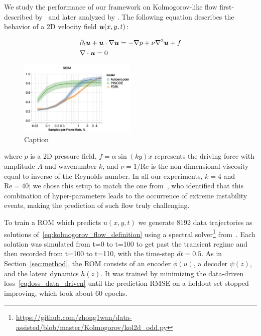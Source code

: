 \label{sec:kolmogorov_flow}
We study the performance of our framework on Kolmogorov-like flow first-described by~\citep{dovzhenko1981generation} and later analyzed by \citep{tithof2017bifurcations,suri2017forecasting}. The following equation describes the behavior of a 2D velocity field $\boldsymbol{u}(x, y, t)$:


\begin{align}
\label{eq:kolmogorov_flow_definition}
	& \partial_t \boldsymbol{u} + \boldsymbol{u} \cdot \nabla \boldsymbol{u} = -\nabla p + \nu\nabla^2\boldsymbol{u} + f \\
	& \nabla \cdot \boldsymbol{u} = 0
\end{align}

\begin{figure}[t]
    \centering
    \includegraphics[width=0.5\textwidth]{figures/cs_kolm_aggregate_all.png}
    \caption{Caption}
    \label{fig:cs_kolm_agg}
\end{figure}

where $p$ is a 2D pressure field, $f = \alpha\sin(ky)x$ represents the driving force with amplitude $A$ and wavenumber $k$, and $\nu = 1/\text{Re}$ is the non-dimensional viscosity equal to inverse of the Reynolds number. In all our experiments, $k = 4$ and $\text{Re} = 40$; we chose this setup to match the one from~\citep{wan2018data}, who identified that this combination of hyper-parameters leads to the occurrence of extreme instability events, making the prediction of such flow truly challenging. 

To train a ROM which predicts $u(x, y, t)$ we generate 8192 data trajectories as solutions of~\eqref{eq:kolmogorov_flow_definition} using a spectral solver\footnote{\href{https://github.com/zhong1wan/data-assisted/blob/master/Kolmogorov/kol2d_odd.py}{https://github.com/zhong1wan/data-assisted/blob/master/Kolmogorov/kol2d\_odd.py}} from~\citep{wan2018data}. Each solution was simulated from t=0 to t=100 to get past the transient regime and then recorded from t=100 to t=110, with the time-step $dt=0.5$. As in Section~\ref{sec:method}, the ROM consists of an encoder $\phi(u)$, a decoder $\psi(z)$, and the latent dynamics $h(z)$. It was trained by minimizing the data-driven loss~\eqref{eq:loss_data_driven} until the prediction RMSE on a holdout set stopped improving, which took about 60 epochs. 

